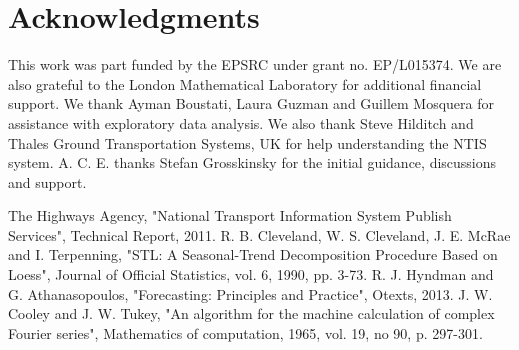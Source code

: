 \documentclass[conference, letterpaper]{IEEEtran}
\begin{document}
\section*{Acknowledgments}
This work was part funded by the EPSRC under grant no. EP/L015374. 
We are also grateful to the London Mathematical Laboratory for additional financial support. 
We thank Ayman Boustati, Laura Guzman and Guillem Mosquera for assistance with exploratory data analysis. 
We also thank Steve Hilditch and Thales Ground Transportation Systems, UK for help understanding the NTIS system.  
A. C. E. thanks Stefan Grosskinsky for the initial guidance, discussions and support.


\begin{thebibliography}{00}
 The Highways Agency, "National Transport Information System Publish Services", Technical Report, 2011. 
 R. B. Cleveland, W. S. Cleveland, J. E. McRae and I. Terpenning, "STL: A Seasonal-Trend Decomposition Procedure Based on Loess", Journal of Official Statistics, vol. 6, 1990, pp. 3-73.
 R. J. Hyndman and G. Athanasopoulos, "Forecasting: Principles and Practice", Otexts, 2013.
 J. W. Cooley and J. W. Tukey, "An algorithm for the machine calculation of complex Fourier series", Mathematics of computation, 1965, vol. 19, no 90, p. 297-301.

\end{thebibliography}
\end{document}
